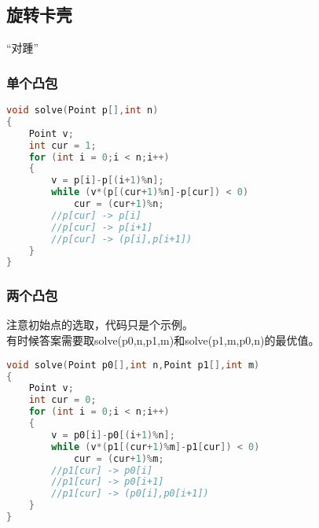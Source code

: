 \subsection{旋转卡壳}
    “对踵”\\
    \subsubsection{单个凸包}
	\begin{lstlisting}[language=c++]
void solve(Point p[],int n)
{
    Point v;
    int cur = 1;
    for (int i = 0;i < n;i++)
    {
        v = p[i]-p[(i+1)%n];
        while (v*(p[(cur+1)%n]-p[cur]) < 0)
            cur = (cur+1)%n;
        //p[cur] -> p[i]
        //p[cur] -> p[i+1]
        //p[cur] -> (p[i],p[i+1])
    }
}
	\end{lstlisting}
    \subsubsection{两个凸包}
	注意初始点的选取，代码只是个示例。\\
	有时候答案需要取solve(p0,n,p1,m)和solve(p1,m,p0,n)的最优值。\\
	\begin{lstlisting}[language=c++]
void solve(Point p0[],int n,Point p1[],int m)
{
    Point v;
    int cur = 0;
    for (int i = 0;i < n;i++)
    {
        v = p0[i]-p0[(i+1)%n];
        while (v*(p1[(cur+1)%m]-p1[cur]) < 0)
            cur = (cur+1)%m;
        //p1[cur] -> p0[i]
        //p1[cur] -> p0[i+1]
        //p1[cur] -> (p0[i],p0[i+1])
    }
}
	\end{lstlisting}